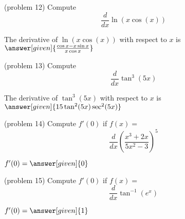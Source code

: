 \documentclass{ximera}
\begin{document}
\begin{problem}(problem 12)
  Compute
  \[
  \frac{d}{dx} \ln(x\cos (x))
  \]
  
    
		The derivative of $\ln(x\cos (x))$ with respect to $x$ is
		 $\answer[given]{\frac{\cos x - x\sin x}{x\cos x}}$
		
\end{problem}



\begin{problem}(problem 13)
  Compute
  \[
  \frac{d}{dx} \tan^3(5x)
  \]
  
   
		The derivative of $\tan^3(5x)$ with respect to $x$ is
		 $\answer[given]{15\tan^2(5x)\sec^2(5x)}$
		
\end{problem}



\begin{problem}(problem 14)
  Compute $f'(0)$ if $f(x)=$
  \[
  \frac{d}{dx} \left(\frac{x^3 + 2x}{5x^2 -3}\right)^5
  \]
  
 
		 $f'(0) = \answer[given]{0}$
		
\end{problem}



\begin{problem}(problem 15)
  Compute $f'(0)$ if $f(x)=$
  \[
  \frac{d}{dx} \tan^{-1}(e^x)
  \]
  
 
		 $f'(0) = \answer[given]{1}$
		
\end{problem}
\end{document}
